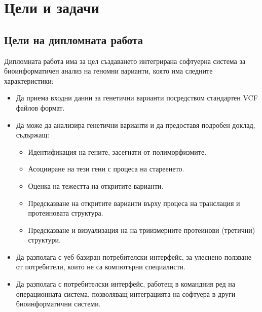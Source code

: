 \documentclass[pdftex,cyrillic,14pt,a4page,twoside]{extreport}
\begin{document}
\chapter{Цели и задачи}
\section{Цели на дипломната работа}
Дипломната работа има за цел създаването интегрирана софтуерна система за биоинформатичен анализ на геномни варианти, която има следните характеристики:
\begin{itemize}
  \item Да приема входни данни за генетични варианти посредством стандартен VCF файлов формат.
  \item Да може да анализира генетични варианти и да предоставя подробен доклад, съдържащ:
  	\begin{itemize}
  		\item Идентификация на гените, засегнати от полиморфизмите.
  		\item Асоцииране на тези гени с процеса на стареенето.
  		\item Оценка на тежестта на откритите варианти.
  		\item Предсказване на откритите варианти върху процеса на транслация и протеиновата структура.
  		\item Предсказване и визуализация на на триизмерните протеинови (третични) структури.
 	\end{itemize}
  \item Да разполага с уеб-базиран потребителски интерфейс, за улеснено ползване от
потребители, които не са компютърни специалисти.
  \item Да разполага с потребителски интерфейс, работещ в командния ред на операционната система, позволяващ
интеграцията на софтуера в други биоинформатични системи.
\end{itemize}
\end{document}
